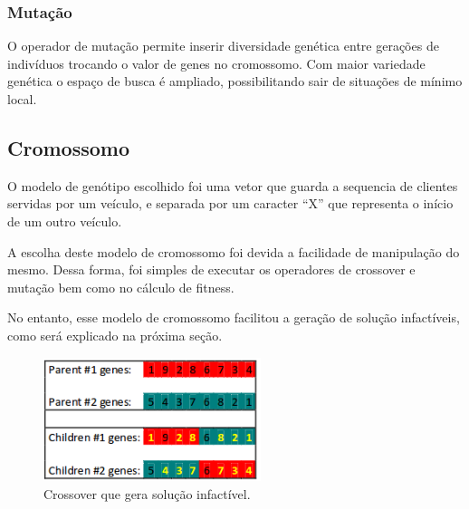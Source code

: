 \documentclass[conference]{IEEEtran}
\begin{document}
\subsubsection{Mutação}
O operador de mutação permite inserir diversidade genética entre gerações de indivíduos trocando o valor de genes no cromossomo. Com maior variedade genética o espaço de busca é ampliado, possibilitando sair de situações de mínimo local.




\subsection{Cromossomo}
O modelo de genótipo escolhido foi uma vetor que guarda a sequencia de clientes servidas por um veículo, e separada por um caracter ``X'' que representa o início de um outro veículo.

A escolha deste modelo de cromossomo foi devida a facilidade de manipulação do mesmo. Dessa forma, foi simples de executar os operadores de crossover e mutação bem como no cálculo de fitness.

No entanto, esse modelo de cromossomo facilitou a geração de solução infactíveis, como será explicado na próxima seção.

\begin{figure}[!t]
\centering
\includegraphics[width=2.5in]{error_in_crossover}
\caption{Crossover que gera solução infactível.}
\label{fig_sim}
\end{figure}
\end{document}
